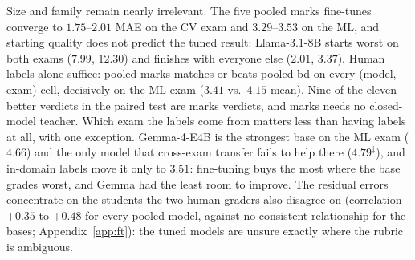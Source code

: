   Size and family remain nearly irrelevant. The five pooled marks fine-tunes converge to $1.75$--$2.01$ MAE on the CV exam and $3.29$--$3.53$ on the ML, and starting quality does not predict the tuned result: Llama-3.1-$8$B starts
  worst on both exams ($7.99$, $12.30$) and finishes with everyone else ($2.01$, $3.37$).   Human labels alone suffice: pooled marks matches or beats pooled bd on every (model, exam) cell, decisively on the ML exam ($3.41$ vs.\ $4.15$ mean). Nine of the eleven better verdicts in the paired test are marks verdicts, and
  marks needs no closed-model teacher. Which exam the labels come from matters less than having labels at all, with one exception. Gemma-4-E$4$B is the
  strongest base on the ML exam ($4.66$) and the only model that cross-exam transfer fails to help there ($4.79^\ddagger$), and in-domain labels move it only to $3.51$: fine-tuning buys the most where the base grades worst, and
  Gemma had the least room to improve. The residual errors concentrate on the students the two human graders also disagree on (correlation $+0.35$ to $+0.48$ for every pooled model, against no consistent relationship for the bases; Appendix~\ref{app:ft}): the tuned models are unsure exactly where the rubric is ambiguous.
